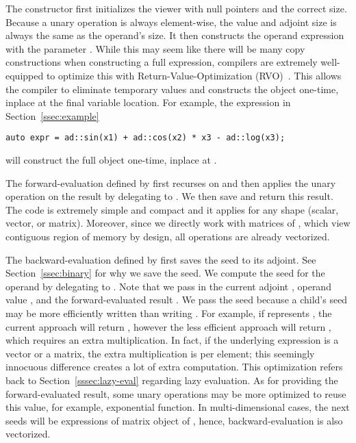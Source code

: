 The constructor first initializes the viewer with null pointers and the correct size.
Because a unary operation is always element-wise,
the value and adjoint size is always the same as the operand's size.
It then constructs the operand expression with the parameter .
While this may seem like there will be many copy constructions when constructing a full expression,
compilers are extremely well-equipped to optimize this with 
Return-Value-Optimization (RVO)~\cite{meyers:1995}.
This allows the compiler to eliminate temporary values and constructs the object 
one-time, inplace at the final variable location.
For example, the expression in Section~\ref{ssec:example}
\begin{lstlisting}[style=customcpp]
    auto expr = ad::sin(x1) + ad::cos(x2) * x3 - ad::log(x3);
\end{lstlisting}
will construct the full object one-time, inplace at .

The forward-evaluation defined by  first
recurses on  and then applies the unary operation
on the result by delegating to .
We then save and return this result.
The code is extremely simple and compact and it applies for any shape (scalar, vector, or matrix).
Moreover, since we directly work with  matrices of , 
which view contiguous region of memory by design,
all operations are already vectorized.

The backward-evaluation defined by  first saves the seed to its adjoint.
See Section~\ref{ssec:binary} for why we save the seed.
We compute the seed for the operand by delegating to .
Note that we pass in the current adjoint , 
operand value , and 
the forward-evaluated result .
We pass the seed because a child's seed may be more efficiently written 
than writing .
For example, if  represents ,
the current approach will return , however
the less efficient approach will return ,
which requires an extra multiplication.
In fact, if the underlying expression is a vector or a matrix,
the extra multiplication is per element;
this seemingly innocuous difference creates a lot of extra computation.
This optimization refers back to Section~\ref{sssec:lazy-eval} regarding lazy evaluation.
As for providing the forward-evaluated result, 
some unary operations may be more optimized to reuse this value,
for example, exponential function.
In multi-dimensional cases, the next seeds will be  expressions
of matrix object of , hence, backward-evaluation is also vectorized.

